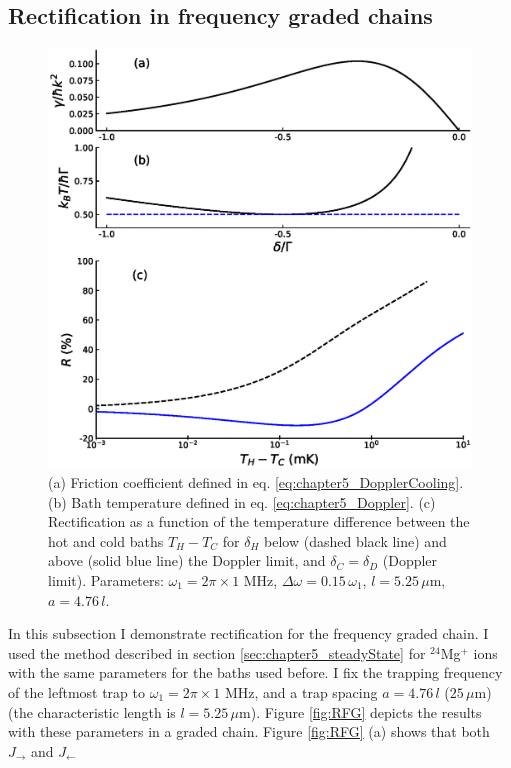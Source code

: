 \subsection{Rectification in frequency graded chains \label{GradedChains}}
%
%
\begin{figure}
  \center
  \includegraphics[width=0.85\linewidth]{Figures/R_as_function_of_TemperatureBias.eps}
  \caption{ (a) Friction coefficient defined in eq. \eqref{eq:chapter5_DopplerCooling}. (b) Bath temperature defined in eq. \eqref{eq:chapter5_Doppler}. (c) Rectification as a function of the temperature difference between the hot and cold baths $T_H -T_C$ for $\delta_H$ below (dashed black line) and above (solid blue line) the Doppler limit, and $\delta_C=\delta_D$ (Doppler limit). Parameters: $\omega_1 = 2 \pi \times 1$ MHz, $\Delta \omega = 0.15 \, \omega_1$, $l = 5.25\,\mu$m, $a = 4.76 \, l$.}
  \label{fig:RD}
\end{figure}
%
In this subsection I demonstrate rectification for the frequency graded chain. I  used the method described in section \ref{sec:chapter5_steadyState} for $^{24}$Mg$^+$ ions with the same parameters for the baths used before. I fix the trapping frequency of the leftmost trap to $\omega_1 = 2\pi \times 1$ MHz, and a trap spacing $a = 4.76\, l$ ($25\,\mu$m) (the  characteristic length is $l = 5.25\,\mu$m). Figure \ref{fig:RFG} depicts  the results with these parameters in a graded chain. Figure \ref{fig:RFG} (a) shows that both
$J_\rightarrow$ and $J_\leftarrow$
